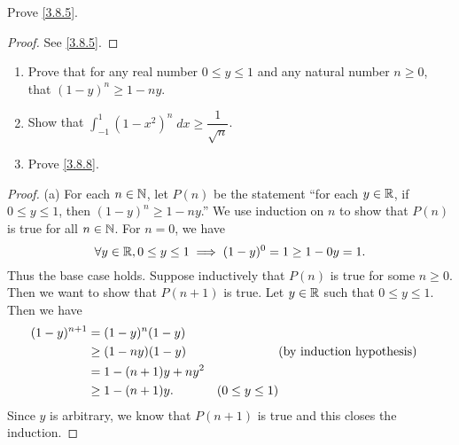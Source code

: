 \exercisesection

\begin{ex}\label{ex:3.8.1}
  Prove \cref{3.8.5}.
\end{ex}

\begin{proof}
  See \cref{3.8.5}.
\end{proof}

\begin{ex}\label{ex:3.8.2}
  \quad
  \begin{enumerate}
    \item Prove that for any real number \(0 \leq y \leq 1\) and any natural number \(n \geq 0\), that \((1 - y)^n \geq 1 - ny\).
    \item Show that \(\int_{-1}^1 (1 - x^2)^n \; dx \geq \dfrac{1}{\sqrt{n}}\).
    \item Prove \cref{3.8.8}.
  \end{enumerate}
\end{ex}

\begin{proof}{(a)}
  For each \(n \in \mathbb{N}\), let \(P(n)\) be the statement ``for each \(y \in \mathbb{R}\), if \(0 \leq y \leq 1\), then \((1 - y)^n \geq 1 - ny\).''
  We use induction on \(n\) to show that \(P(n)\) is true for all \(n \in \mathbb{N}\).
  For \(n = 0\), we have
  \[
    \forall y \in \mathbb{R}, 0 \leq y \leq 1 \implies (1 - y)^0 = 1 \geq 1 - 0y = 1.
  \]
  Thus the base case holds.
  Suppose inductively that \(P(n)\) is true for some \(n \geq 0\).
  Then we want to show that \(P(n + 1)\) is true.
  Let \(y \in \mathbb{R}\) such that \(0 \leq y \leq 1\).
  Then we have
  \begin{align*}
    (1 - y)^{n + 1} & = (1 - y)^n (1 - y)                                \\
                    & \geq (1 - ny) (1 - y)  &                   & \text{(by induction hypothesis)} \\
                    & = 1 - (n + 1)y + n y^2                             \\
                    & \geq 1 - (n + 1)y.     & (0 \leq y \leq 1)
  \end{align*}
  Since \(y\) is arbitrary, we know that \(P(n + 1)\) is true and this closes the induction.
\end{proof}

